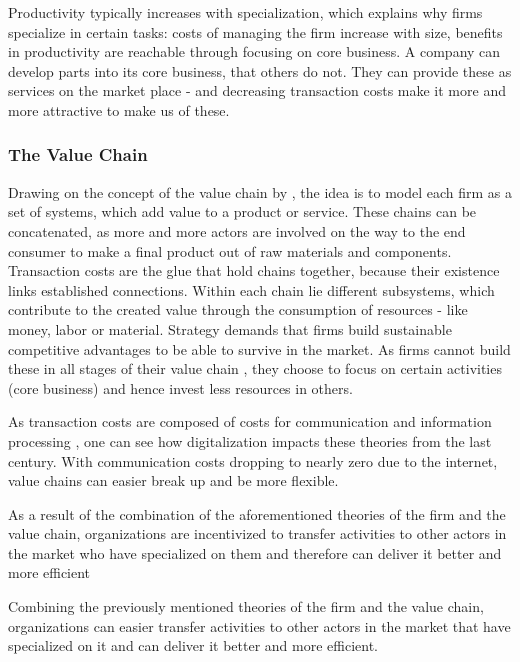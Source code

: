 		Productivity typically increases with specialization, which explains why firms specialize in certain tasks: costs of managing the firm increase with size, benefits in productivity are reachable through focusing on core business.
		A company can develop parts into its core business, that others do not. They can provide these as services on the market place - and decreasing transaction costs make it more and more attractive to make us of these. 
		
		\subsubsection{The Value Chain}
		Drawing on the concept of the value chain by \cite{porter1985}, the idea is to model each firm as a set of systems, which add value to a product or service. These chains can be concatenated, as more and more actors are involved on the way to the end consumer to make a final product out of raw materials and components. Transaction costs are the glue that hold chains together, because their existence links established connections.  Within each chain lie different subsystems, which contribute to the created value through the consumption of resources - like money, labor or material. Strategy demands that firms build sustainable competitive advantages to be able to survive in the market. As firms cannot build these in all stages of their value chain \citep{Ramachandran2004}, they choose to focus on certain activities (core business) and hence invest less resources in others. 
		
		As transaction costs are composed of costs for communication and information processing \citep{evansted}, one can see how digitalization impacts these theories from the last century. With communication costs dropping to nearly zero due to the internet, value chains can easier break up and be more flexible. 
		
		As a result of the combination of the aforementioned theories of the firm and the value chain, organizations are incentivized to transfer activities to other actors in the market who have specialized on them and therefore can deliver it better and more efficient 
		
		Combining the previously mentioned theories of the firm and the value chain, organizations can easier transfer activities to other actors in the market that have specialized on it and can deliver it better and more efficient.  
		
